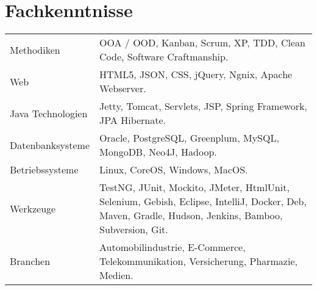 \section*{Fachkenntnisse}
\begin{longtable}{@{}p{6cm}p{10cm}}
Methodiken	        & OOA / OOD, Kanban, Scrum, XP, TDD, Clean Code, Software Craftmanship.\\
Web         	    & HTML5, JSON, CSS, jQuery, Ngnix, Apache Webserver.\\
Java Technologien	& Jetty, Tomcat, Servlets, JSP, Spring Framework, JPA Hibernate.\\
Datenbanksysteme	& Oracle, PostgreSQL, Greenplum, MySQL, MongoDB, Neo4J, Hadoop.\\
Betriebssysteme	    & Linux, CoreOS, Windows, MacOS.\\
Werkzeuge		    & TestNG, JUnit, Mockito, JMeter, HtmlUnit, Selenium, Gebish, Eclipse, IntelliJ, Docker, Deb, Maven, Gradle, Hudson, Jenkins, Bamboo, Subversion, Git.\\
Branchen		    & Automobilindustrie, E-Commerce, Telekommunikation, Versicherung, Pharmazie, Medien.\\
\end{longtable}
